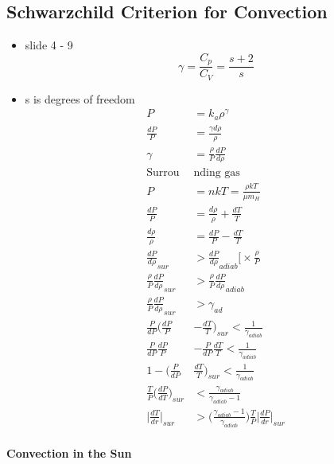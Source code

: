 \documentclass[a4paper,11pt,normalem]{article}
\begin{document}
\subsection{Schwarzchild Criterion for Convection}

\begin{itemize}
    \item slide 4 - 9
        \[
            \gamma = \frac{C_p}{C_V} = \frac{s + 2}{s}
        \]
    \item s is degrees of freedom
        \begin{align*}
            P &= k_a \rho^\gamma \\
            \frac{dP}{P} &= \frac{\gamma d\rho}{\rho} \\
            \gamma &= \frac{\rho}{P}\frac{dP}{d\rho} \\
            \text{Surrou}&\text{nding gas} \\
            P &= nkT = \frac{\rho kT}{\mu m_H} \\
            \frac{dP}{P} &= \frac{d\rho}{\rho} + \frac{dT}{T} \\
            \frac{d\rho}{\rho} &= \frac{dP}{P} - \frac{dT}{T} \\
            \frac{dP}{d\rho}_{sur} &> \frac{dP}{d\rho}_{adiab} \Bigg[\times \frac{\rho}{P} \\
            \frac{\rho}{P}\frac{dP}{d\rho}_{sur} &> \frac{\rho}{P} \frac{dP}{d\rho}_{adiab} \\
            \frac{\rho}{P}\frac{dP}{d\rho}_{sur} &> \gamma_{ad} \\
            \frac{P}{dP}\Big(\frac{dP}{P} &- \frac{dT}{T}\Big)_{sur} < \frac{1}{\gamma_{adiab}} \\
            \frac{P}{dP}\frac{dP}{P} &- \frac{P}{dP}\frac{dT}{T} < \frac{1}{\gamma_{adiab}} \\
            1 - \Big(\frac{P}{dP}&\frac{dT}{T}\Big)_{sur} < \frac{1}{\gamma_{adiab}} \\
            \frac{T}{P} \Big(\frac{dP}{dT}\Big)_{sur} &< \frac{\gamma_{adiab}}{\gamma_{adiab} - 1} \\
            \Big|\frac{dT}{dr}\Big|_{sur} &> \Big(\frac{\gamma_{adiab} - 1}{\gamma_{adiab}}\Big)\frac{T}{P} \Big|\frac{dP}{dr}\Big|_{sur_{}}
        \end{align*}
\end{itemize}

\paragraph{Convection in the Sun}
\end{document}
